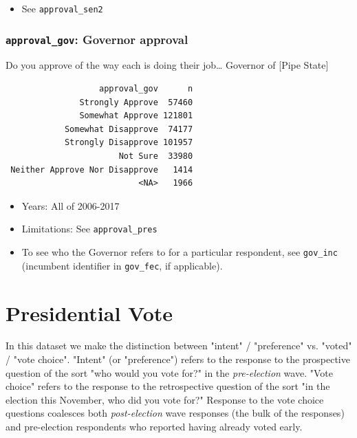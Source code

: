 \documentclass[10pt,article,oneside]{memoir}
\theoremstyle{definition}
\begin{document}
\begin{itemize}
\tightlist
\item
  See \texttt{approval\_sen2}
\end{itemize}

\subsubsection{\texorpdfstring{\texttt{approval\_gov}: Governor
approval}{approval\_gov: Governor approval}}\label{approval_gov-governor-approval}

Do you approve of the way each is doing their job\ldots{} Governor of
{[}Pipe State{]}

\begin{verbatim}
                   approval_gov      n
               Strongly Approve  57460
               Somewhat Approve 121801
            Somewhat Disapprove  74177
            Strongly Disapprove 101957
                       Not Sure  33980
 Neither Approve Nor Disapprove   1414
                           <NA>   1966
\end{verbatim}

\begin{itemize}
\tightlist
\item
  Years: All of 2006-2017
\item
  Limitations: See \texttt{approval\_pres}
\item
  To see who the Governor refers to for a particular respondent, see
  \texttt{gov\_inc} (incumbent identifier in \texttt{gov\_fec}, if
  applicable).
\end{itemize}

\newpage

\section{Presidential Vote}\label{presidential-vote}

\begin{tcolorbox}[title={A note on \texttt{intent} and \texttt{voted}}]
In this dataset we make the distinction between "intent" / "preference" vs. "voted" / "vote choice". "Intent" (or "preference") refers to the response to the prospective question of the sort "who would you vote for?" in the \emph{pre-election} wave. "Vote choice" refers to the response to the retrospective question of the sort "in the election this November, who did you vote for?" Response to the vote choice questions coalesces both \emph{post-election} wave responses (the bulk of the responses) and pre-election respondents who reported having already voted early. 
\end{tcolorbox}
\end{document}
